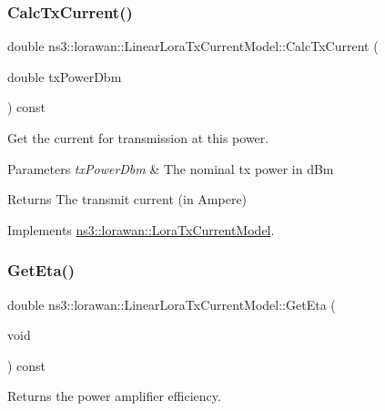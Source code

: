 \subsubsection{\texorpdfstring{Calc\+Tx\+Current()}{CalcTxCurrent()}}
{\footnotesize\ttfamily double ns3\+::lorawan\+::\+Linear\+Lora\+Tx\+Current\+Model\+::\+Calc\+Tx\+Current (\begin{DoxyParamCaption}\item[{double}]{tx\+Power\+Dbm }\end{DoxyParamCaption}) const\hspace{0.3cm}{\ttfamily [virtual]}}

Get the current for transmission at this power.


\begin{DoxyParams}{Parameters}
{\em tx\+Power\+Dbm} & The nominal tx power in d\+Bm \\
\hline
\end{DoxyParams}
\begin{DoxyReturn}{Returns}
The transmit current (in Ampere) 
\end{DoxyReturn}


Implements \hyperlink{classns3_1_1lorawan_1_1LoraTxCurrentModel_ad4143a40cb10d4cbd4bf838e006780c7}{ns3\+::lorawan\+::\+Lora\+Tx\+Current\+Model}.

\mbox{\label{classns3_1_1lorawan_1_1LinearLoraTxCurrentModel_a4e15519375a8f9b0a43cc5e437461e5a}} 
\subsubsection{\texorpdfstring{Get\+Eta()}{GetEta()}}
{\footnotesize\ttfamily double ns3\+::lorawan\+::\+Linear\+Lora\+Tx\+Current\+Model\+::\+Get\+Eta (\begin{DoxyParamCaption}\item[{void}]{ }\end{DoxyParamCaption}) const}

\begin{DoxyReturn}{Returns}
the power amplifier efficiency. 
\end{DoxyReturn}
\mbox{\label{classns3_1_1lorawan_1_1LinearLoraTxCurrentModel_a74cf9badafdd63a68f40f8d3cb9898cb}} 
